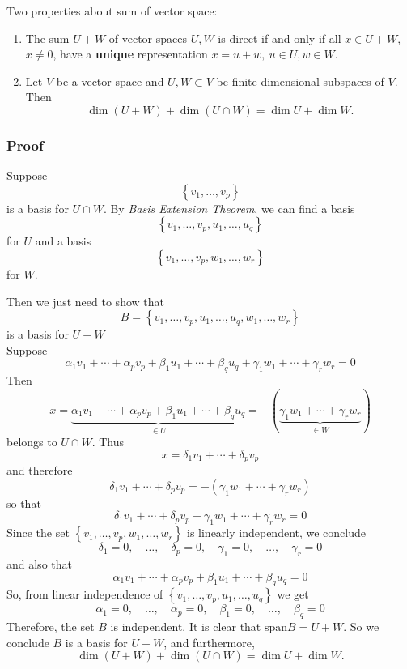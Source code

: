 \documentclass[12pt, t]{beamer}
\renewcommand{\emph}[1]{{\color{Turquoise3}\textsl{#1}}}
\begin{document}
\begin{frame}[allowframebreaks]
    \newpage
    Two properties about sum of vector space:\\
    \begin{enumerate}
        \item The sum $U+W$ of vector spaces $U,W$ is direct if and only if all $x\in U+W$, $x\neq0$, have a \textbf{unique} representation $x=u+w,~u\in U,w\in W$.
        \item Let $V$ be a vector space and $U,W\subset V$ be finite-dimensional subspaces of $V$. Then
              \[\dim(U+W)+\dim(U\cap W)=\dim U+\dim W.\]
    \end{enumerate}

\end{frame}

\begin{frame}[allowframebreaks]
    \frametitle{Proof}
    Suppose $$\left\{v_{1}, \ldots, v_{p}\right\}$$ is a basis for $U \cap W$.
    By \emph{Basis Extension Theorem}, we can find a basis
    $$\left\{v_{1}, \ldots, v_{p}, u_{1}, \ldots, u_{q}\right\}$$ for $U$ and a basis
    $$\left\{v_{1}, \ldots, v_{p}, w_{1}, \ldots, w_{r}\right\}$$ for $W$.

    Then we just need to show that $$B=\left\{v_{1}, \ldots, v_{p}, u_{1}, \ldots, u_{q}, w_{1}, \ldots, w_{r}\right\}$$ is a basis for $U+W$\\
    \newpage
    Suppose
    $$
        \alpha_{1} v_{1}+\cdots+\alpha_{p} v_{p}+\beta_{1} u_{1}+\cdots+\beta_{q} u_{q}+\gamma_{1} w_{1}+\cdots+\gamma_{r} w_{r}=0
    $$
    Then
    $$
        x=\underbrace{\alpha_{1} v_{1}+\cdots+\alpha_{p} v_{p}+\beta_{1} u_{1}+\cdots+\beta_{q} u_{q}}_{\in U}=-(\underbrace{\gamma_{1} w_{1}+\cdots+\gamma_{r} w_{r}}_{\in W})
    $$
    belongs to $U \cap W$. Thus
    $$
        x=\delta_{1} v_{1}+\cdots+\delta_{p} v_{p}
    $$
    and therefore
    $$
        \delta_{1} v_{1}+\cdots+\delta_{p} v_{p}=-\left(\gamma_{1} w_{1}+\cdots+\gamma_{r} w_{r}\right)
    $$
    so that
    $$
        \delta_{1} v_{1}+\cdots+\delta_{p} v_{p}+\gamma_{1} w_{1}+\cdots+\gamma_{r} w_{r}=0
    $$
    Since the set $\left\{v_{1}, \ldots, v_{p}, w_{1}, \ldots, w_{r}\right\}$ is linearly independent, we conclude
    $$
        \delta_{1}=0, \quad \ldots, \quad \delta_{p}=0, \quad \gamma_{1}=0, \quad \ldots, \quad \gamma_{r}=0
    $$
    and also that
    $$
        \alpha_{1} v_{1}+\cdots+\alpha_{p} v_{p}+\beta_{1} u_{1}+\cdots+\beta_{q} u_{q}=0
    $$
    So, from linear independence of $\left\{v_{1}, \ldots, v_{p}, u_{1}, \ldots, u_{q}\right\}$ we get
    $$
        \alpha_{1}=0, \quad \ldots, \quad \alpha_{p}=0, \quad \beta_{1}=0, \quad \ldots, \quad \beta_{q}=0
    $$
    Therefore, the set $B$ is independent. It is clear that $\text{span} B=U+W$. So we conclude $B$ is a basis for $U+W$, and furthermore,
    \[\dim(U+W)+\dim(U\cap W)=\dim U+\dim W.\]
\end{frame}
\end{document}
